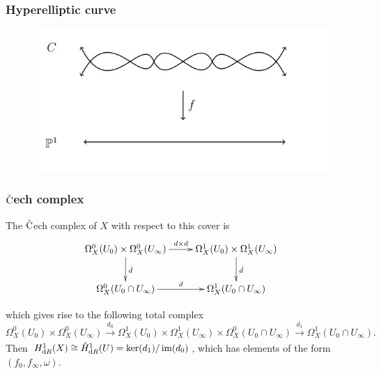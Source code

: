 \documentclass{beamer}
\begin{document}
\begin{frame}
\end{frame}

\begin{frame}
\frametitle{Hyperelliptic curve}
\begin{figure}
\includegraphics[width=0.8\linewidth]{Double_Cover.jpg}
\end{figure}
\end{frame}

\begin{frame}
\frametitle{$\check{\text C}$ech complex}
The $\check {\text C}$ech complex of $X$ with respect to this cover is
\begin{displaymath}
    \xymatrix{
        \Omega^0_X(U_0)\times \Omega_X^0(U_\infty) \ar[r]^{d \times d} \ar[d]^{\check d} & \Omega^1_X(U_0) \times \Omega_X^1(U_\infty) \ar[d]^{\check d} \\
        \Omega_X^0(U_0\cap U_\infty) \ar[r]^{d}                      & \Omega_X^1(U_0 \cap U_\infty)
    }
\end{displaymath}
\pause

which gives rise to the following total complex
\begin{equation*}
\Omega^0_X(U_0) \times \Omega_X^0(U_\infty) \xrightarrow[]{d_0} \Omega_X^1(U_0)\times \Omega_X^1(U_\infty) \times \Omega_X^0(U_0 \cap U_\infty) \xrightarrow[]{d_1} \Omega^1_X(U_0 \cap U_\infty).
\end{equation*}
\pause
Then $H^1_{\text dR}(X) \cong \check{H}^1_{\text dR}(U) = \operatorname{ker}(d_1)/\operatorname{im}(d_0)$, which has elements of the form $(f_0, f_\infty , \omega)$.
\end{frame}
\end{document}
